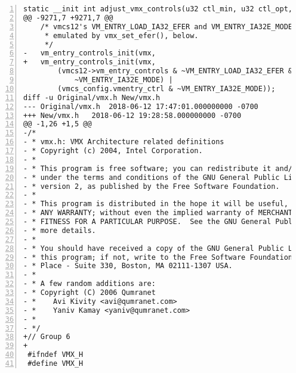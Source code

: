 \documentclass[10pt,draftclsnofoot,journal,compsoc,onecolumn]{IEEEtran}
\begin{document}
\begin{lstlisting}[numbers=left]
 static __init int adjust_vmx_controls(u32 ctl_min, u32 ctl_opt,
@@ -9271,7 +9271,7 @@
 	/* vmcs12's VM_ENTRY_LOAD_IA32_EFER and VM_ENTRY_IA32E_MODE are
 	 * emulated by vmx_set_efer(), below.
 	 */
-	vm_entry_controls_init(vmx, 
+	vm_entry_controls_init(vmx,
 		(vmcs12->vm_entry_controls & ~VM_ENTRY_LOAD_IA32_EFER &
 			~VM_ENTRY_IA32E_MODE) |
 		(vmcs_config.vmentry_ctrl & ~VM_ENTRY_IA32E_MODE));
diff -u Original/vmx.h New/vmx.h
--- Original/vmx.h	2018-06-12 17:47:01.000000000 -0700
+++ New/vmx.h	2018-06-12 19:28:58.000000000 -0700
@@ -1,26 +1,5 @@
-/*
- * vmx.h: VMX Architecture related definitions
- * Copyright (c) 2004, Intel Corporation.
- *
- * This program is free software; you can redistribute it and/or modify it
- * under the terms and conditions of the GNU General Public License,
- * version 2, as published by the Free Software Foundation.
- *
- * This program is distributed in the hope it will be useful, but WITHOUT
- * ANY WARRANTY; without even the implied warranty of MERCHANTABILITY or
- * FITNESS FOR A PARTICULAR PURPOSE.  See the GNU General Public License for
- * more details.
- *
- * You should have received a copy of the GNU General Public License along with
- * this program; if not, write to the Free Software Foundation, Inc., 59 Temple
- * Place - Suite 330, Boston, MA 02111-1307 USA.
- *
- * A few random additions are:
- * Copyright (C) 2006 Qumranet
- *    Avi Kivity <avi@qumranet.com>
- *    Yaniv Kamay <yaniv@qumranet.com>
- *
- */
+// Group 6
+
 #ifndef VMX_H
 #define VMX_H
\end{lstlisting}
\end{document}
